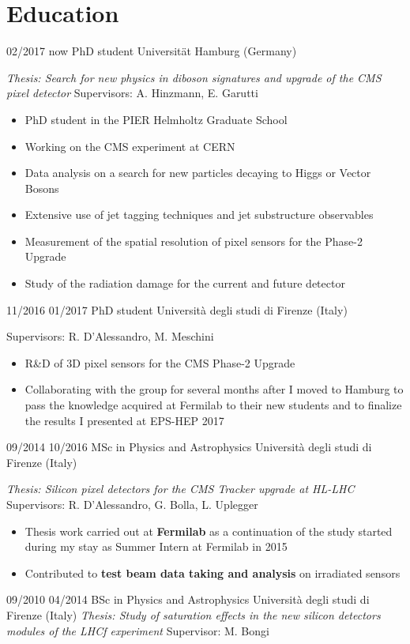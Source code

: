   \section{Education}
    \position
      {02/2017 \textemdash{} now}
      {PhD student}
      {Universit\"{a}t Hamburg (Germany)}
      {\textit{Thesis: Search for new physics in diboson signatures and upgrade of the CMS pixel detector} \newline  Supervisors: A. Hinzmann, E. Garutti \newline \begin{itemize}
\item PhD student in the PIER Helmholtz Graduate School
\item  Working on the CMS experiment at CERN
\item Data analysis on a search for new particles decaying to Higgs or Vector Bosons
\item Extensive use of jet tagging techniques and jet substructure observables
\item Measurement of the spatial resolution of pixel sensors for the Phase-2 Upgrade
\item Study of the radiation damage for the current and future detector
\end{itemize}}
    \position
      {11/2016 \textemdash{} 01/2017}
      {PhD student}
      {Universit\`a degli studi di Firenze (Italy)}
      {Supervisors: R. D'Alessandro, M. Meschini \newline \begin{itemize}
\item R\&D of 3D pixel sensors for the CMS Phase-2  Upgrade
\item Collaborating with the group for several months after I moved to Hamburg to pass the knowledge acquired at Fermilab to their new students and to finalize the results I presented at EPS-HEP 2017
\end{itemize} 
}
  \position
      {09/2014 \textemdash{} 10/2016}
      {MSc in Physics and Astrophysics}
      {Universit\`a degli studi di Firenze (Italy)}
      {\textit{Thesis: Silicon pixel detectors for the CMS Tracker upgrade at HL-LHC} \newline Supervisors: R. D'Alessandro, G. Bolla, L. Uplegger   \newline
      \begin{itemize}
\item Thesis work carried out at {\bf Fermilab} as a continuation of the study started during my stay as Summer Intern at Fermilab in 2015
\item Contributed to  {\bf test beam data taking and analysis} on irradiated sensors
\end{itemize}
 }
    \position
      {09/2010 \textemdash{} 04/2014}
      {BSc in Physics and Astrophysics}
      {Universit\`a degli studi di Firenze (Italy)}
      {\textit{Thesis:  Study of saturation effects in the new silicon detectors modules of the LHCf experiment}  \newline Supervisor: M. Bongi }
\fi
